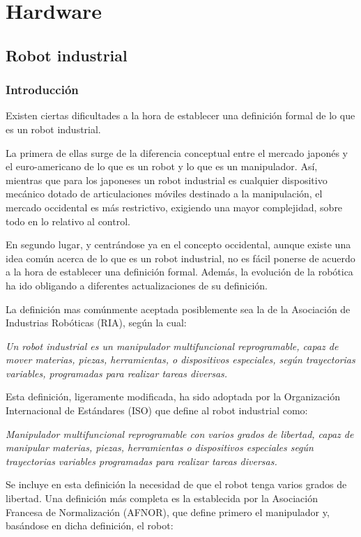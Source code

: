\documentclass[12pt,a4paper]{report}
\begin{document}
\chapter{Hardware}
\section{Robot industrial}

\subsection{Introducción}

Existen ciertas dificultades a la hora de establecer una definición formal de lo
que es un robot industrial. 

La primera de ellas surge de la diferencia
conceptual entre el mercado japonés y el euro-americano de lo que es un robot y
lo que es un manipulador. Así, mientras que para los japoneses un robot
industrial es cualquier dispositivo mecánico dotado de articulaciones móviles
destinado a la manipulación, el mercado occidental es más restrictivo, exigiendo
una mayor complejidad, sobre todo en lo relativo al control. 

En segundo lugar, y centrándose ya en el concepto occidental, aunque existe una
idea común acerca de lo que es un robot industrial, no es fácil ponerse de
acuerdo a la hora de establecer una definición formal. Además, la evolución de
la robótica ha ido obligando a diferentes actualizaciones de su definición.

La definición mas comúnmente aceptada posiblemente sea la de la Asociación de
Industrias Robóticas (RIA), según la cual:

\emph{Un robot industrial es un manipulador multifuncional reprogramable, capaz de
mover materias, piezas, herramientas, o dispositivos especiales, según
trayectorias variables, programadas para realizar tareas diversas.}

Esta definición, ligeramente modificada, ha sido adoptada por la Organización
Internacional de Estándares (ISO) que define al robot industrial como:

\emph{Manipulador multifuncional reprogramable con varios grados de libertad, capaz de
manipular materias, piezas, herramientas o dispositivos especiales según
trayectorias variables programadas para realizar tareas diversas.}

Se incluye en esta definición la necesidad de que el robot tenga varios grados
de libertad. Una definición más completa es la establecida por la Asociación
Francesa de Normalización (AFNOR), que define primero el manipulador y,
basándose en dicha definición, el robot:
\end{document}
